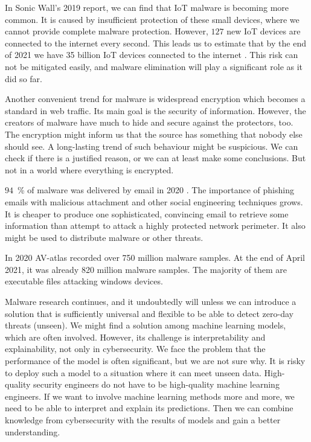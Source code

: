 In Sonic Wall's 2019 report, we can find that IoT malware is becoming more common. It is caused by insufficient protection of these small devices, where we cannot provide complete malware protection. However, $127$ new IoT devices are connected to the internet every second. This leads us to estimate that by the end of 2021 we have 35 billion IoT devices connected to the internet \cite{TheIoTRu52:online}. This risk can not be mitigated easily, and malware elimination will play a significant role as it did so far.

Another convenient trend for malware is widespread encryption which becomes a standard in web traffic. Its main goal is the security of information. However, the creators of malware have much to hide and secure against the protectors, too. The encryption might inform us that the source has something that nobody else should see. A long-lasting trend of such behaviour might be suspicious. We can check if there is a justified reason, or we can at least make some conclusions. But not in a world where everything is encrypted.

$94$~\% of malware was delivered by email in 2020 \cite{Topcyber13:online}. The importance of phishing emails with malicious attachment and other social engineering techniques grows. It is cheaper to produce one sophisticated, convincing email to retrieve some information than attempt to attack a highly protected network perimeter. It also might be used to distribute malware or other threats.

In 2020 AV-atlas \cite{AVATLASM39:online} recorded over 750 million malware samples. At the end of April 2021, it was already 820 million malware samples. The majority of them are executable files attacking windows devices.

Malware research continues, and it undoubtedly will unless we can introduce a solution that is sufficiently universal and flexible to be able to detect zero-day threats (unseen). We might find a solution among machine learning models, which are often involved. However, its challenge is interpretability and explainability, not only in cybersecurity. We face the problem that the performance of the model is often significant, but we are not sure why. It is risky to deploy such a model to a situation where it can meet unseen data. High-quality security engineers do not have to be high-quality machine learning engineers. If we want to involve machine learning methods more and more, we need to be able to interpret and explain its predictions. Then we can combine knowledge from cybersecurity with the results of models and gain a better understanding. 


